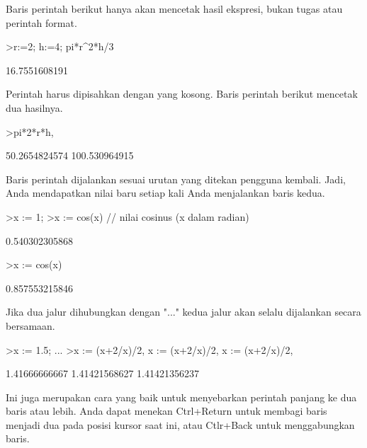 \documentclass{article}
\begin{document}
\begin{eulernotebook}
\begin{eulercomment}
Baris perintah berikut hanya akan mencetak hasil ekspresi, bukan tugas
atau perintah format.
\end{eulercomment}
\begin{eulerprompt}
>r:=2; h:=4; pi*r^2*h/3
\end{eulerprompt}
\begin{euleroutput}
  16.7551608191
\end{euleroutput}
\begin{eulercomment}
Perintah harus dipisahkan dengan yang kosong. Baris perintah berikut
mencetak dua hasilnya.
\end{eulercomment}
\begin{eulerprompt}
>pi*2*r*h, %
\end{eulerprompt}
\begin{euleroutput}
  50.2654824574
  100.530964915
\end{euleroutput}
\begin{eulercomment}
Baris perintah dijalankan sesuai urutan yang ditekan pengguna kembali.
Jadi, Anda mendapatkan nilai baru setiap kali Anda menjalankan baris
kedua.
\end{eulercomment}
\begin{eulerprompt}
>x := 1;
>x := cos(x) // nilai cosinus (x dalam radian)
\end{eulerprompt}
\begin{euleroutput}
  0.540302305868
\end{euleroutput}
\begin{eulerprompt}
>x := cos(x)
\end{eulerprompt}
\begin{euleroutput}
  0.857553215846
\end{euleroutput}
\begin{eulercomment}
Jika dua jalur dihubungkan dengan "..." kedua jalur akan selalu
dijalankan secara bersamaan.
\end{eulercomment}
\begin{eulerprompt}
>x := 1.5; ...
>x := (x+2/x)/2, x := (x+2/x)/2, x := (x+2/x)/2, 
\end{eulerprompt}
\begin{euleroutput}
  1.41666666667
  1.41421568627
  1.41421356237
\end{euleroutput}
\begin{eulercomment}
Ini juga merupakan cara yang baik untuk menyebarkan perintah panjang
ke dua baris atau lebih. Anda dapat menekan Ctrl+Return untuk membagi
baris menjadi dua pada posisi kursor saat ini, atau Ctlr+Back untuk
menggabungkan baris.


\end{eulercomment}
\end{eulernotebook}
\end{document}
